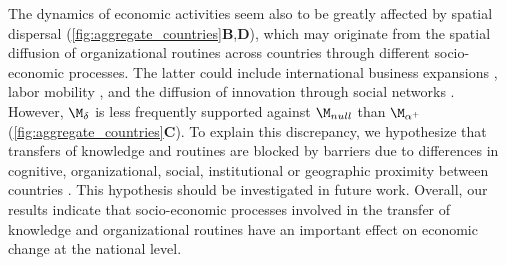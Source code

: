 The dynamics of economic activities seem also to be greatly affected by spatial dispersal (\cref{fig:aggregate_countries}\textbf{B},\textbf{D}), which may originate from the spatial diffusion of organizational routines \citep{Hodgson2004} across countries through different socio-economic processes. 
The latter could include international business expansions \citep{Zahra2000}, labor mobility \citep{Boschma2008}, and the diffusion of innovation through social networks \citep{RogersEverettM2003DoI}. However, $\moddelta$ is less frequently supported against $\modnull$ than $\modalphap$ (\cref{fig:aggregate_countries}\textbf{C}). To explain this discrepancy, we hypothesize that transfers of knowledge and routines are blocked by barriers due to differences in cognitive, organizational, social, institutional or geographic proximity between countries \citep{Boschma2005,Caragliu2016}. This hypothesis should be investigated in future work.
% 
Overall, our results indicate that socio-economic processes involved in the transfer of knowledge and organizational routines have an important effect on economic change at the national level.

